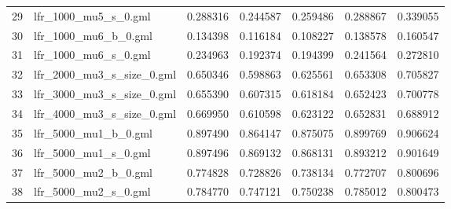 \begin{tabular}{llrrrrr}
29 &        lfr\_1000\_mu5\_s\_0.gml &                          0.288316 &                             0.244587 &                            0.259486 &                           0.288867 &                        0.339055 \\
30 &        lfr\_1000\_mu6\_b\_0.gml &                          0.134398 &                             0.116184 &                            0.108227 &                           0.138578 &                        0.160547 \\
31 &        lfr\_1000\_mu6\_s\_0.gml &                          0.234963 &                             0.192374 &                            0.194399 &                           0.241564 &                        0.272810 \\
32 &   lfr\_2000\_mu3\_s\_size\_0.gml &                          0.650346 &                             0.598863 &                            0.625561 &                           0.653308 &                        0.705827 \\
33 &   lfr\_3000\_mu3\_s\_size\_0.gml &                          0.655390 &                             0.607315 &                            0.618184 &                           0.652423 &                        0.700778 \\
34 &   lfr\_4000\_mu3\_s\_size\_0.gml &                          0.669950 &                             0.610598 &                            0.623122 &                           0.652831 &                        0.688912 \\
35 &        lfr\_5000\_mu1\_b\_0.gml &                          0.897490 &                             0.864147 &                            0.875075 &                           0.899769 &                        0.906624 \\
36 &        lfr\_5000\_mu1\_s\_0.gml &                          0.897496 &                             0.869132 &                            0.868131 &                           0.893212 &                        0.901649 \\
37 &        lfr\_5000\_mu2\_b\_0.gml &                          0.774828 &                             0.728826 &                            0.738134 &                           0.772707 &                        0.800696 \\
38 &        lfr\_5000\_mu2\_s\_0.gml &                          0.784770 &                             0.747121 &                            0.750238 &                           0.785012 &                        0.800473 \\

\end{tabular}
